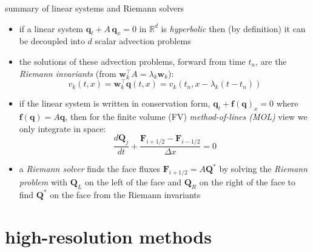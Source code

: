 \documentclass[10pt,hyperref,dvipsnames]{beamer}
\newcommand{\bbf}{\mathbf{f}}
\newcommand{\bq}{\mathbf{q}}
\newcommand{\bw}{\mathbf{w}}
\newcommand{\bF}{\mathbf{F}}
\newcommand{\bQ}{\mathbf{Q}}
\newcommand{\RR}{\mathbb{R}}
\begin{document}
\begin{frame}{summary of linear systems and Riemann solvers}

\begin{itemize}
\item if a linear system $\bq_t + A\, \bq_x=0$ in $\RR^d$ is \alert{\emph{hyperbolic}} then (by definition) it can be decoupled into $d$ scalar advection problems
\item the solutions of these advection problems, forward from time $t_n$, are the \alert{\emph{Riemann invariants}} (from $\bw_k^\top A = \lambda_k \bw_k$):
    $$v_k(t,x) = \bw_k^\top \bq(t,x) = v_k(t_n,x-\lambda_k (t-t_n))$$
\item if the linear system is written in conservation form, $\bq_t + \bbf(\bq)_x=0$ where $\bbf(\bq) = A\bq$, then for the finite volume (FV) \alert{\emph{method-of-lines (MOL)}} view we only integrate in space:
    $$\frac{d\bQ_j}{dt} + \frac{\bF_{i+1/2} - \bF_{i-1/2}}{\Delta x} = 0$$
\item a \alert{\emph{Riemann solver}} finds the face fluxes $\bF_{i+1/2}=A \bQ^*$ by solving the \emph{Riemann problem} with $\bQ_L$ on the left of the face and $\bQ_R$ on the right of the face to find $\bQ^*$ on the face from the Riemann invariants
\end{itemize}
\end{frame}


\section{high-resolution methods}
\end{document}
